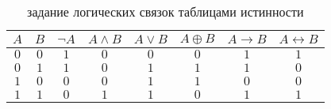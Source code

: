 \begin{table}[ht!]
    \center
    \begin{tabular}{|c|c|c|c|c|c|c|c|}
         \hline
         $ A $  &  $ B $  &  $ \neg A $  &  $ A \wedge B $  &  $ A \vee B $  &  $ A \oplus B $  &  $ A \rightarrow B $  &  $ A \leftrightarrow B $ \\
         \hline
         \hline
         $ 0 $  &  $ 0 $  &  $ 1 $       &  $ 0 $           &  $ 0 $         &  $ 0 $           &  $ 1 $                &  $ 1 $                   \\
         $ 0 $  &  $ 1 $  &  $ 1 $       &  $ 0 $           &  $ 1 $         &  $ 1 $           &  $ 1 $                &  $ 0 $                   \\
         $ 1 $  &  $ 0 $  &  $ 0 $       &  $ 0 $           &  $ 1 $         &  $ 1 $           &  $ 0 $                &  $ 0 $                   \\
         $ 1 $  &  $ 1 $  &  $ 0 $       &  $ 1 $           &  $ 1 $         &  $ 0 $           &  $ 1 $                &  $ 1 $                   \\
         \hline
    \end{tabular}
    \caption{задание логических связок таблицами истинности}
    \label{tab:boolean:truth_tables}
\end{table}

%


